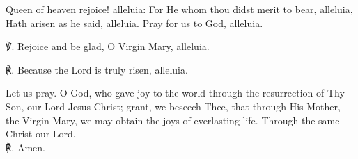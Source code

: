 \begin{otherlanguage}{english}\noindent Queen of heaven rejoice! alleluia:
For He whom thou didst merit to bear, alleluia,
Hath arisen as he said, alleluia.
Pray for us to God, alleluia.

\noindent ℣. Rejoice and be glad, O Virgin Mary, alleluia.

\noindent ℟. Because the Lord is truly risen, alleluia.

\noindent Let us pray. O God, who gave joy to the world through the resurrection of Thy Son, our Lord Jesus Christ; grant, we beseech Thee, that through His Mother, the Virgin Mary, we may obtain the joys of everlasting life. Through the same Christ our Lord. \\ ℟. Amen.
\end{otherlanguage}
